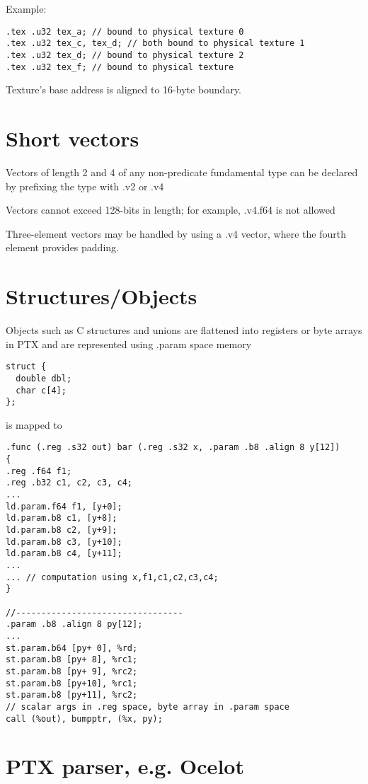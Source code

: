 Example:
\begin{lstlisting}
.tex .u32 tex_a; // bound to physical texture 0
.tex .u32 tex_c, tex_d; // both bound to physical texture 1
.tex .u32 tex_d; // bound to physical texture 2
.tex .u32 tex_f; // bound to physical texture
\end{lstlisting}

Texture's base address is aligned to 16-byte boundary. 

\section{Short vectors}
\label{sec:short-vectors}

Vectors of length 2 and 4 of any non-predicate fundamental type can be
declared by prefixing the type with .v2 or .v4

Vectors cannot exceed 128-bits in length; for example, .v4.f64 is not
allowed

Three-element vectors may be handled by using a .v4 vector, where the
fourth element provides padding.

\section{Structures/Objects}
\label{sec:structuresobjects}

Objects such as C structures and unions are flattened into registers
or byte arrays in PTX and are represented using .param space memory
\begin{lstlisting}
struct {
  double dbl;
  char c[4];
};
\end{lstlisting}
is mapped to
\begin{lstlisting}
.func (.reg .s32 out) bar (.reg .s32 x, .param .b8 .align 8 y[12])
{
.reg .f64 f1;
.reg .b32 c1, c2, c3, c4;
...
ld.param.f64 f1, [y+0];
ld.param.b8 c1, [y+8];
ld.param.b8 c2, [y+9];
ld.param.b8 c3, [y+10];
ld.param.b8 c4, [y+11];
...
... // computation using x,f1,c1,c2,c3,c4;
}

//---------------------------------
.param .b8 .align 8 py[12];
...
st.param.b64 [py+ 0], %rd;
st.param.b8 [py+ 8], %rc1;
st.param.b8 [py+ 9], %rc2;
st.param.b8 [py+10], %rc1;
st.param.b8 [py+11], %rc2;
// scalar args in .reg space, byte array in .param space
call (%out), bumpptr, (%x, py);
\end{lstlisting}

\section{PTX parser, e.g. Ocelot}
\label{sec:Ocelot}

